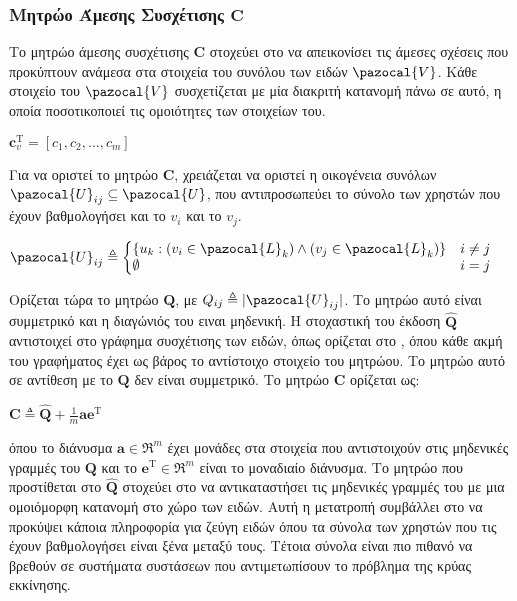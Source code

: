 \subsubsection{Μητρώο Άμεσης Συσχέτισης $\mathbf{C}$}
Το μητρώο άμεσης συσχέτισης $\mathbf{C}$ στοχεύει στο να απεικονίσει τις άμεσες σχέσεις που προκύπτουν ανάμεσα στα στοιχεία του συνόλου των ειδών $\pazocal{V}$. Κάθε στοιχείο του $\pazocal{V}$ συσχετίζεται με μία διακριτή κατανομή πάνω σε αυτό, η οποία ποσοτικοποιεί τις ομοιότητες των στοιχείων του. 
\begin{center}
$\mathbf{c}_v^\text{T} = [c_1, c_2, \dots, c_m]$
\end{center}
Για να οριστεί το μητρώο $\mathbf{C}$, χρειάζεται να οριστεί η οικογένεια συνόλων $\pazocal{U}_{ij} \subseteq \pazocal{U}$, που αντιπροσωπεύει το σύνολο των χρηστών που έχουν βαθμολογήσει και το $v_i$ και το $v_j$. 
\begin{center}
$\pazocal{U}_{ij} \triangleq \left\{
    \begin{array}{@{} l c @{}}
      \{u_k : (v_i \in \pazocal{L}_k) \wedge (v_j \in \pazocal{L}_k)\} & i \neq j \\
      \emptyset & i = j
    \end{array}\right.$
\end{center}
Ορίζεται τώρα το μητρώο $\mathbf{Q}$, με $Q_{ij} \triangleq |\pazocal{U}_{ij}|$. Το μητρώο αυτό είναι συμμετρικό και η διαγώνιός του ειναι μηδενική. Η στοχαστική του έκδοση $\mathbf{\hat{Q}}$ αντιστοιχεί στο γράφημα συσχέτισης των ειδών, όπως ορίζεται στο \cite{Gori:2007:IRB:1625275.1625720}, όπου κάθε ακμή του γραφήματος έχει ως βάρος το αντίστοιχο στοιχείο του μητρώου. Το μητρώο αυτό σε αντίθεση με το $\mathbf{Q}$ δεν είναι συμμετρικό. Το μητρώο $\mathbf{C}$ ορίζεται ως:
\begin{center}
$\mathbf{C} \triangleq \mathbf{\hat{Q}} + \frac{1}{m}\mathbf{a}\mathbf{e}^\text{T}$
\end{center}
όπου το διάνυσμα $\mathbf{a} \in \Re^m$ έχει μονάδες στα στοιχεία που αντιστοιχούν στις μηδενικές γραμμές του $\mathbf{Q}$ και το $\mathbf{e}^\text{T} \in \Re^m$ είναι το μοναδιαίο διάνυσμα. Το μητρώο που προστίθεται στο $\mathbf{\hat{Q}}$ στοχεύει στο να αντικαταστήσει τις μηδενικές γραμμές του με μια ομοιόμορφη κατανομή στο χώρο των ειδών. Αυτή η μετατροπή συμβάλλει στο να προκύψει κάποια πληροφορία για ζεύγη ειδών όπου τα σύνολα των χρηστών που τις έχουν βαθμολογήσει είναι ξένα μεταξύ τους. Τέτοια σύνολα είναι πιο πιθανό να βρεθούν σε συστήματα συστάσεων που αντιμετωπίσουν το πρόβλημα της κρύας εκκίνησης. 

